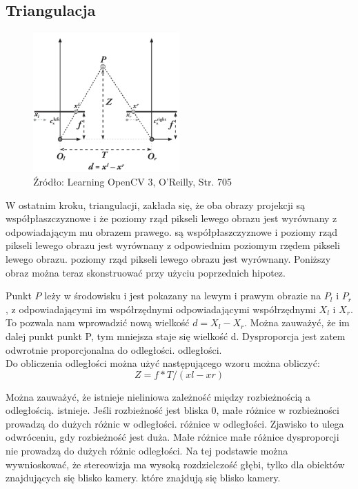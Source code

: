 \documentclass[magisterska]{pracadypl}
\begin{document}
\subsection{Triangulacja}

\begin{figure}[h]  %
    \centering  %
    \includegraphics[width=0.5\textwidth]{images/triangulation.png}  %
    \captionsetup{labelformat=empty, font=footnotesize}
    \caption{Źródło: Learning OpenCV 3, O'Reilly, Str. 705}
    \label{fig:rpi}  %
\end{figure}

W ostatnim kroku, triangulacji, zakłada się, że oba obrazy projekcji są współpłaszczyznowe i że poziomy rząd pikseli lewego obrazu jest wyrównany z odpowiadającym mu obrazem prawego.
są współpłaszczyznowe i poziomy rząd pikseli lewego obrazu jest wyrównany z odpowiednim poziomym rzędem pikseli lewego obrazu.
poziomy rząd pikseli lewego obrazu jest wyrównany.
Poniższy obraz można teraz skonstruować przy użyciu poprzednich hipotez.

Punkt $P$ leży w środowisku i jest pokazany na
lewym i prawym obrazie na $P_l$ i $P_r$, z odpowiadającymi im współrzędnymi
odpowiadającymi współrzędnymi $X_l$ i $X_r$. To
pozwala nam wprowadzić nową wielkość
$d = X_l - X_r$. Można zauważyć, że im dalej punkt
punkt P, tym mniejsza staje się wielkość d. Dysproporcja
jest zatem odwrotnie proporcjonalna do odległości.
odległości.\\
Do obliczenia odległości można użyć następującego wzoru
można obliczyć: \[Z=f*T/(xl-xr)\]

Można zauważyć, że istnieje nieliniowa zależność między rozbieżnością a odległością.
istnieje. Jeśli rozbieżność jest bliska 0, małe różnice w rozbieżności prowadzą do dużych różnic w odległości.
różnice w odległości. Zjawisko to ulega odwróceniu, gdy rozbieżność jest duża. Małe różnice
małe różnice dysproporcji nie prowadzą do dużych różnic odległości. Na tej podstawie
można wywnioskować, że stereowizja ma wysoką rozdzielczość głębi, tylko dla obiektów znajdujących się blisko kamery.
które znajdują się blisko kamery.
\end{document}
